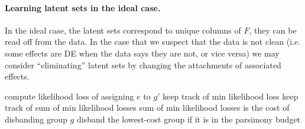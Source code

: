 \documentclass{article}
\begin{document}
\paragraph{Learning latent sets in the ideal case.}
In the ideal case, the latent sets correspond to unique columns of $F$, they can be read off from the data.
In the case that we suspect that the data is not clean (i.e. some effects are DE when the data says they are not, or vice versa) we may consider ``eliminating'' latent sets by changing the attachments of associated effects.
\begin{algorithmic}
\REPEAT
        \STATE compute likelihood loss of assigning $e$ to $g'$
        \STATE keep track of min likelihood loss
      \ENDFOR
      \STATE keep track of sum of min likelihood losses
    \ENDFOR
    \STATE sum of min likelihood losses is the cost of disbanding group $g$
  \ENDFOR
  \STATE disband the lowest-cost group if it is in the parsimony budget
\end{algorithmic}



\printbibliography
\end{document}
